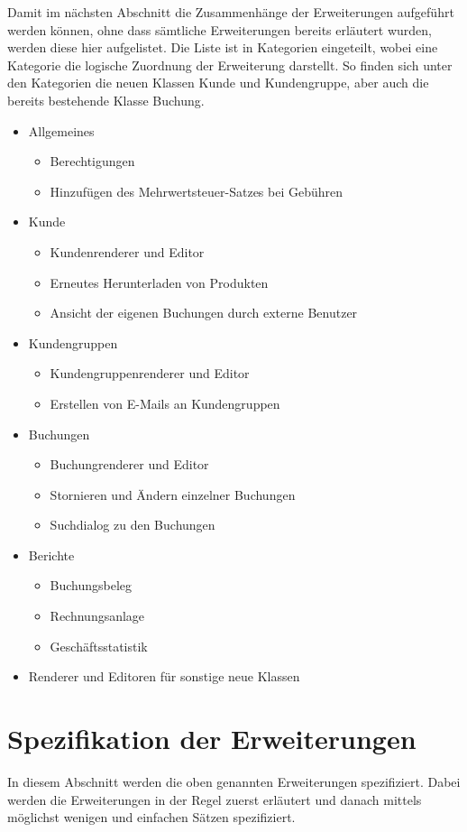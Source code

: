 Damit im nächsten Abschnitt die Zusammenhänge der Erweiterungen aufgeführt werden können, ohne dass sämtliche Erweiterungen bereits erläutert wurden, werden diese hier aufgelistet.
Die Liste ist in Kategorien eingeteilt, wobei eine Kategorie die logische Zuordnung der Erweiterung darstellt. So finden sich unter den Kategorien die neuen Klassen Kunde und Kundengruppe, aber auch die bereits bestehende Klasse Buchung. 
\begin{itemize}
	\item Allgemeines
	\begin{itemize}
		\item Berechtigungen
		\item Hinzufügen des Mehrwertsteuer-Satzes bei Gebühren
	\end{itemize}
	\item Kunde
	\begin{itemize}
		\item Kundenrenderer und Editor
		\item Erneutes Herunterladen von Produkten
		\item Ansicht der eigenen Buchungen durch externe Benutzer
	\end{itemize}
	\item Kundengruppen
	\begin{itemize}
		\item Kundengruppenrenderer und Editor
		\item Erstellen von E-Mails an Kundengruppen
	\end{itemize}
	\item Buchungen
	\begin{itemize}
		\item Buchungrenderer und Editor
		\item Stornieren und Ändern einzelner Buchungen
		\item Suchdialog zu den Buchungen
	\end{itemize}
	\item Berichte
	\begin{itemize}
		\item Buchungsbeleg
		\item Rechnungsanlage
		\item Geschäftsstatistik
	\end{itemize}	 
	\item Renderer und Editoren für sonstige neue Klassen
\end{itemize}

\section{Spezifikation der Erweiterungen} \label{sec:spezifikation}
In diesem Abschnitt werden die oben genannten Erweiterungen spezifiziert. Dabei werden die Erweiterungen in der Regel zuerst erläutert und danach mittels möglichst wenigen und einfachen Sätzen spezifiziert.

